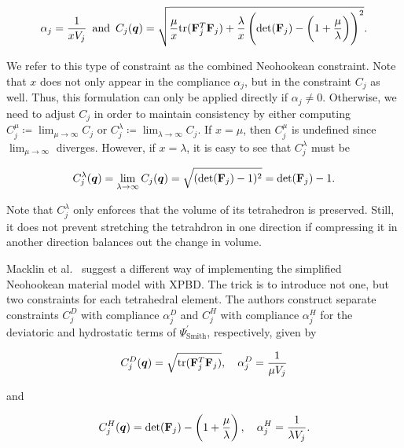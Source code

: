 \[
    \alpha_j = \frac{1}{x V_j} \, \, \, \text{and} \, \, \, C_j(\bm{q}) = \sqrt{\frac{\mu}{x}\text{tr}(\mathbf{F}_j^T\mathbf{F}_j)     
    + \frac{\lambda}{x}\left(\text{det}(\mathbf{F}_j) - \left(1 + \frac{\mu}{\lambda}\right)\right)^2}.
\]

\noindent We refer to this type of constraint as the combined Neohookean constraint. Note that $x$ does not only appear in the 
compliance $\alpha_j$, but in the constraint $C_j$ as well. Thus, this formulation can only be applied directly if $\alpha_j \neq 0$. 
Otherwise, we need to adjust $C_j$ in order to maintain consistency by either computing $C^\mu_j \coloneqq \lim_{\mu\to\infty}C_j$ 
or $C^\lambda_j \coloneqq \lim_{\lambda\to\infty}C_j$. If $x = \mu$, then $C^\mu_j$ is undefined since $\lim_{\mu\to\infty}$ diverges. 
However, if $x = \lambda$, it is easy to see that $C^\lambda_j$ must be

\begin{equation}\label{eq:combined-neohookean-0-compliance}
    C^\lambda_j(\bm{q}) = \lim_{\lambda\to\infty}  C_j(\bm{q}) = \sqrt{(\text{det}(\mathbf{F}_j) - 1)^2} = \text{det}(\mathbf{F}_j) - 1.
\end{equation}
    

\noindent Note that $C^\lambda_j$ only enforces that the volume of its tetrahedron is preserved. Still, it does not prevent stretching the 
tetrahdron in one direction if compressing it in another direction balances out the change in volume. 

Macklin et al.\ \cite{macklin2021} suggest a different way of implementing the simplified Neohookean material model with XPBD. The trick is 
to introduce not one, but two constraints for each tetrahedral element. The authors construct separate constraints $C^D_j$ with compliance 
$\alpha^D_j$ and $C^H_j$ with compliance $\alpha^H_j$ for the deviatoric and hydrostatic terms of $\Psi^\prime_{\text{Smith}}$, respectively, 
given by 

\begin{equation}\label{eq:deviatoric-constraint}
    C^D_j(\bm{q}) = \sqrt{\text{tr}(\mathbf{F}_j^T\mathbf{F}_j)}, \, \, \, \, \, \, \alpha^D_j = \frac{1}{\mu V_j}
\end{equation}

\noindent and 

\begin{equation}\label{eq:hydrostatic-constraint}
    C^H_j(\bm{q}) = \text{det}(\mathbf{F}_j) - \left(1 + \frac{\mu}{\lambda}\right), \, \, \, \, \, \, \alpha^H_j = \frac{1}{\lambda V_j}.
\end{equation}

